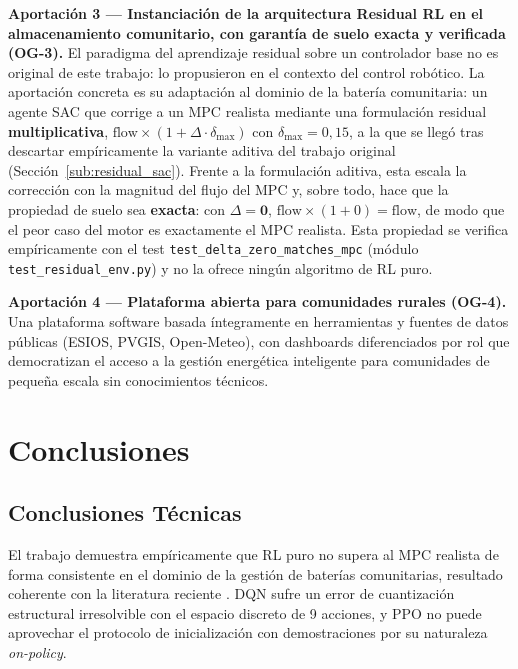 \documentclass[12pt, a4paper, twoside]{report}
\begin{document}
\textbf{Aportación 3 — Instanciación de la arquitectura Residual RL en el
almacenamiento comunitario, con garantía de suelo exacta y verificada (OG-3).}
El paradigma del aprendizaje residual sobre un controlador base no es original
de este trabajo: lo propusieron \citet{Johannink2019} en el contexto del control
robótico. La aportación concreta es su adaptación al dominio de la batería
comunitaria: un agente SAC que corrige a un MPC realista mediante una
formulación residual \textbf{multiplicativa},
$\text{flow}\times(1+\Delta\cdot\delta_{\max})$ con $\delta_{\max}=0{,}15$, a la
que se llegó tras descartar empíricamente la variante aditiva del trabajo
original (Sección~\ref{sub:residual_sac}). Frente a la formulación aditiva, esta
escala la corrección con la magnitud del flujo del MPC y, sobre todo, hace que
la propiedad de suelo sea \textbf{exacta}: con $\Delta = \mathbf{0}$,
$\text{flow}\times(1+0)=\text{flow}$, de modo que el peor caso del motor es
exactamente el MPC realista. Esta propiedad se verifica empíricamente con el
test \texttt{test\_delta\_zero\_matches\_mpc} (módulo
\texttt{test\_residual\_env.py}) y no la ofrece ningún algoritmo de RL puro.

\textbf{Aportación 4 — Plataforma abierta para comunidades rurales (OG-4).}
Una plataforma software basada íntegramente en herramientas y fuentes de datos
públicas (ESIOS, PVGIS, Open-Meteo), con dashboards diferenciados por rol que
democratizan el acceso a la gestión energética inteligente para comunidades de
pequeña escala sin conocimientos técnicos.

\chapter{Conclusiones}
\label{chap:conclusiones}

\section{Conclusiones Técnicas}

El trabajo demuestra empíricamente que RL puro no supera al MPC realista de
forma consistente en el dominio de la gestión de baterías comunitarias, resultado
coherente con la literatura reciente \citep{Zhan2023}. DQN sufre un error de
cuantización estructural irresolvible con el espacio discreto de 9 acciones,
y PPO no puede aprovechar el protocolo de inicialización con demostraciones por
su naturaleza \textit{on-policy}.
\end{document}
